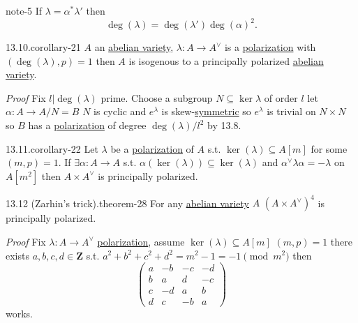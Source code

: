\documentclass[10pt,]{book}
\makeatletter
\renewcommand*{\proofname}{Proof}
\renewenvironment{proof}[1][\proofname]{\par
  \pushQED{\qed}%
  \normalfont \topsep6\p@\@plus6\p@\relax
  \trivlist
  \item\relax
    {\itshape
    #1\@addpunct{.}}\hspace\labelsep\ignorespaces
}{%
  \popQED\endtrivlist\@endpefalse
}
\numberwithin{equation}{section}
\newcommand{\lb}{[}
\newcommand{\rb}{]}
\newcommand{\ZZ}{\mathbf{Z}}
\newcommand{\amp}{&}
\makeatother
\begin{document}
\begin{note}{}{note-5}%
\hypertarget{p-323}{}%
If \(\lambda = \alpha^* \lambda'\) then%
\begin{equation*}
\deg(\lambda) = \deg (\lambda') \deg(\alpha)^2\text{.}
\end{equation*}
%
\end{note}
\begin{corollary}{13.10.}{}{corollary-21}%
\hypertarget{p-324}{}%
\(A\) an \hyperref[def-buntes-abvar]{abelian variety}, \(\lambda \colon A \to A^\vee\) is a \hyperref[def-polarization]{polarization} with \((\deg (\lambda), p) = 1\) then \(A\) is  isogenous to a principally polarized \hyperref[def-buntes-abvar]{abelian variety}.%
\end{corollary}
\begin{proof}\hypertarget{proof-54}{}
\hypertarget{p-325}{}%
Fix \(l |\deg(\lambda)\) prime. Choose a subgroup \(N\subseteq \ker \lambda\) of order \(l\) let \(\alpha \colon A\to A/N = B\) \(N\) is cyclic and \(e^\lambda\) is skew-\hyperref[def-princ-pol]{symmetric} so \(e^{\lambda}\) is trivial on \(N\times N\) so \(B\) has a \hyperref[def-polarization]{polarization} of degree \(\deg(\lambda) / l^2\) by 13.8.%
\end{proof}
\begin{corollary}{13.11.}{}{corollary-22}%
\hypertarget{p-326}{}%
Let \(\lambda\) be a \hyperref[def-polarization]{polarization} of \(A\) s.t. \(\ker (\lambda) \subseteq A\lb m \rb\) for some \((m,p)=1\). If \(\exists \alpha \colon A \to A\) s.t. \(\alpha(\ker (\lambda)) \subseteq \ker(\lambda)\) and \(\alpha^\vee \lambda \alpha = - \lambda\) on \(A\lb m^2\rb\) then \(A\times A^\vee\) is principally polarized.%
\end{corollary}
\begin{theorem}{13.12 (Zarhin's trick).}{}{theorem-28}%
\hypertarget{p-327}{}%
For any \hyperref[def-buntes-abvar]{abelian variety} \(A\) \((A\times A^\vee)^4\) is principally polarized.%
\end{theorem}
\begin{proof}\hypertarget{proof-55}{}
\hypertarget{p-328}{}%
Fix \(\lambda \colon A\to A^\vee\) \hyperref[def-polarization]{polarization}, assume \(\ker (\lambda) \subseteq A\lb m \rb\) \((m, p) = 1\) there exists \(a,b,c,d \in \ZZ\) s.t. \(a^2 + b^2 + c^2 + d^2 = m^2  - 1 = -1 \pmod {m^2}\) then%
\begin{equation*}
\begin{pmatrix} a\amp -b \amp-c\amp -d \\ b\amp a \amp d \amp -c \\ c\amp -d \amp a \amp b \\ d \amp c \amp -b \amp a\end{pmatrix}
\end{equation*}
works.%
\end{proof}
\end{document}
